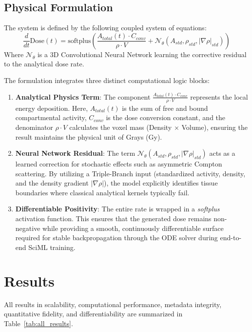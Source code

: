 \documentclass[a4paper,10pt]{elsarticle}
\begin{document}
\subsection{Physical Formulation}
The system is defined by the following coupled system of equations:
\begin{equation}
    \frac{d}{dt} \text{Dose}(t) = \text{softplus} \left( \frac{A_{total}(t) \cdot C_{conv}}{\rho \cdot V} + \mathcal{N}_\theta(A_{std}, \rho_{std}, |\nabla \rho|_{std}) \right)
\end{equation}
Where $\mathcal{N}_\theta$ is a 3D Convolutional Neural Network learning the corrective residual to the analytical dose rate. 

The formulation integrates three distinct computational logic blocks:
\begin{enumerate}
    \item \textbf{Analytical Physics Term}: The component $\frac{A_{total}(t) \cdot C_{conv}}{\rho \cdot V}$ represents the local energy deposition. Here, $A_{total}(t)$ is the sum of free and bound compartmental activity, $C_{conv}$ is the dose conversion constant, and the denominator $\rho \cdot V$ calculates the voxel mass (Density $\times$ Volume), ensuring the result maintains the physical unit of Grays (Gy).
    \item \textbf{Neural Network Residual}: The term $\mathcal{N}_\theta(A_{std}, \rho_{std}, |\nabla \rho|_{std})$ acts as a learned correction for stochastic effects such as asymmetric Compton scattering. By utilizing a Triple-Branch input (standardized activity, density, and the density gradient $|\nabla \rho|$), the model explicitly identifies tissue boundaries where classical analytical kernels typically fail.
    \item \textbf{Differentiable Positivity}: The entire rate is wrapped in a \textit{softplus} activation function. This ensures that the generated dose remains non-negative while providing a smooth, continuously differentiable surface required for stable backpropagation through the ODE solver during end-to-end SciML training.
\end{enumerate}



\section{Results }
All results in scalability, computational performance, metadata integrity, quantitative fidelity, and differentiability are summarized in Table~\ref{tab:all_results}.
\end{document}
